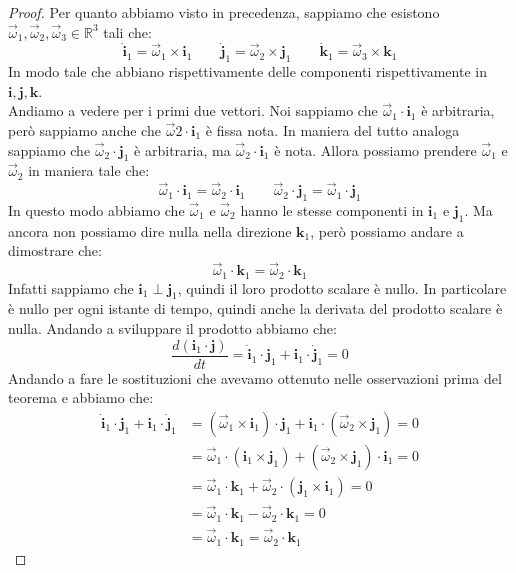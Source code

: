 \documentclass[11pt,a4paper,twoside]{article}
\theoremstyle{definition}
\begin{document}
\begin{proof}
	Per quanto abbiamo visto in precedenza, sappiamo che esistono $\vec \omega_1, \vec \omega_2, \vec \omega_3 \in \mathbb R^3$ tali che:
	\[
		\dot{\mathbf i}_1 = \vec\omega_1 \times \mathbf i_1\qquad \dot{\mathbf j}_1 = \vec\omega_2 \times \mathbf j_1\qquad \dot{\mathbf k}_1 = \vec\omega_3 \times \mathbf k_1
	\]
	In modo tale che abbiano rispettivamente delle componenti rispettivamente in $\mathbf i, \mathbf j,\mathbf k$.\\
	Andiamo a vedere per i primi due vettori. Noi sappiamo che $\vec \omega_1 \cdot \mathbf i_1$ è arbitraria, però sappiamo anche che $\vec \omega 2 \cdot \mathbf i_1$ è fissa nota.
	In maniera del tutto analoga sappiamo che $\vec \omega_2 \cdot \mathbf j_1$ è arbitraria, ma $\vec \omega_2 \cdot \mathbf i_1$ è nota. Allora possiamo prendere $\vec\omega_1$ e $\vec \omega_2$ in maniera tale che:
	\[ \vec \omega_1 \cdot \mathbf i_1 = \vec \omega_2 \cdot \mathbf i_1\qquad \vec \omega_2 \cdot \mathbf j_1 = \vec \omega_1 \cdot \mathbf j_1 \]
	In questo modo abbiamo che $\vec \omega_1$ e $\vec \omega_2$ hanno le stesse componenti in $\mathbf i_1$ e $\mathbf j_1$. Ma ancora non possiamo dire nulla nella direzione $\mathbf k_1$, però possiamo andare a dimostrare che:
	\[ \vec \omega_1 \cdot \mathbf k_1 = \vec \omega_2 \cdot \mathbf k_1 \]
	Infatti sappiamo che $\mathbf i_1\perp \mathbf j_1$, quindi il loro prodotto scalare è nullo. In particolare è nullo per ogni istante di tempo, quindi anche la derivata del prodotto scalare è nulla. Andando a sviluppare il prodotto abbiamo che:
	\[\frac{d(\mathbf i_1 \cdot \mathbf j)}{dt} = \dot{\mathbf i}_1\cdot \mathbf j_1 + \mathbf i_1 \cdot \dot{\mathbf j}_1 = 0\]
	Andando a fare le sostituzioni che avevamo ottenuto nelle osservazioni prima del teorema e abbiamo che:
	\begin{align*}
		\dot{\mathbf i}_1\cdot \mathbf j_1 + \mathbf i_1 \cdot \dot{\mathbf j}_1 &=
		(\vec \omega_1 \times \mathbf i_1) \cdot \mathbf j_1 + \mathbf i_1 \cdot (\vec \omega_2 \times \mathbf j_1) = 0\\
		&= \vec \omega_1 \cdot (\mathbf i_1 \times \mathbf j_1) + (\vec \omega_2 \times \mathbf j_1) \cdot \mathbf i_1 =0\\
		&= \vec \omega_1 \cdot \mathbf k_1 + \vec \omega_2 \cdot (\mathbf j_1 \times \mathbf i_1) = 0\\
		&= \vec \omega_1 \cdot \mathbf k_1 - \vec \omega_2 \cdot \mathbf k_1 = 0\\
		&= \vec \omega_1 \cdot \mathbf k_1 = \vec \omega_2 \cdot \mathbf k_1

\end{align*}
\end{proof}
\end{document}
